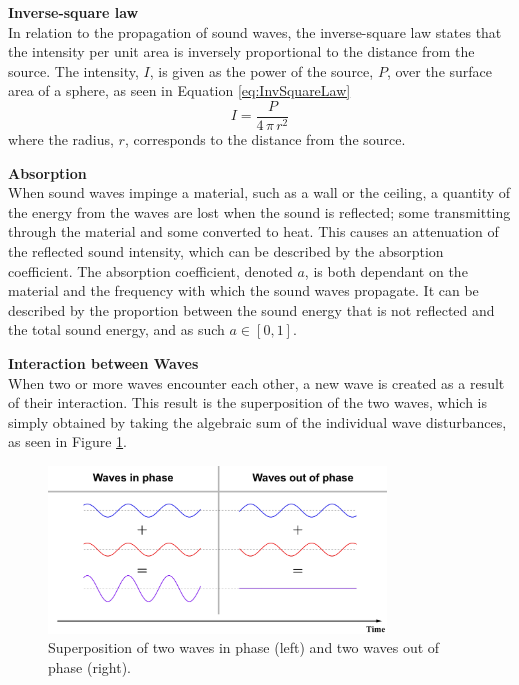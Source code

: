 \textbf{Inverse-square law}\\
In relation to the propagation of sound waves, the inverse-square law states that the intensity per unit area is inversely proportional to the distance from the source. The intensity, $I$, is given as the power of the source, $P$, over the surface area of a sphere, as seen in Equation \eqref{eq:InvSquareLaw}
\begin{equation}\label{eq:InvSquareLaw}
    I = \frac{P}{4\,\pi\,r^2}
\end{equation}
where the radius, $r$, corresponds to the distance from the source. 

\textbf{Absorption}\\
When sound waves impinge a material, such as a wall or the ceiling, a quantity of the energy from the waves are lost when the sound is reflected; some transmitting through the material and some converted to heat. This causes an attenuation of the reflected sound intensity, which can be described by the absorption coefficient. The absorption coefficient, denoted $a$, is both dependant on the material and the frequency with which the sound waves propagate. It can be described by the proportion between the sound energy that is not reflected and the total sound energy, and as such $a\in[0,1]$. \cite{Acoustics:Absorption}

\textbf{Interaction between Waves}\\ 
When two or more waves encounter each other, a new wave is created as a result of their interaction. This result is the superposition of the two waves, which is simply obtained by taking the algebraic sum of the individual wave disturbances, as seen in Figure \ref{fig:superposition}.

\begin{figure}[H]
    \centering
    \includegraphics[width=0.8\textwidth]{figures/1Problem_analysis/Superposition.pdf}
    \caption{Superposition of two waves in phase (left) and two waves out of phase (right).}
    \label{fig:superposition}
\end{figure}

